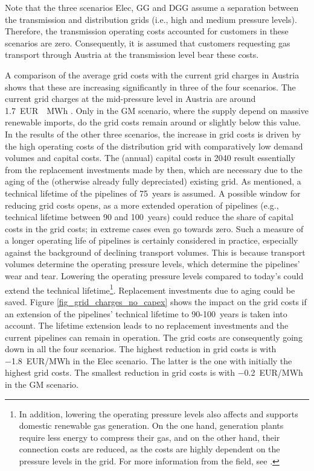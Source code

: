 Note that the three scenarios Elec, GG and DGG assume a separation between the transmission and distribution grids (i.e., high and medium pressure levels). Therefore, the transmission operating costs accounted for customers in these scenarios are zero. Consequently, it is assumed that customers requesting gas transport through Austria at the transmission level bear these costs.\vspace{0.3cm}

A comparison of the average grid costs with the current grid charges in Austria shows that these are increasing significantly in three of the four scenarios. The current grid charges at the mid-pressure level in Austria are around \SI{1.7}{EUR \per MWh} \cite{econtrol_gas_charges}. Only in the GM scenario, where the supply depend on massive renewable imports, do the grid costs remain around or slightly below this value. In the results of the other three scenarios, the increase in grid costs is driven by the high operating costs of the distribution grid with comparatively low demand volumes and capital costs. The (annual) capital costs in 2040 result essentially from the replacement investments made by then, which are necessary due to the aging of the (otherwise already fully depreciated) existing grid. As mentioned, a technical lifetime of the pipelines of \SI{75}{years} is assumed. A possible window for reducing grid costs opens, as a more extended operation of pipelines (e.g., technical lifetime between 90 and \SI{100}{years}) could reduce the share of capital costs in the grid costs; in extreme cases even go towards zero. Such a measure of a longer operating life of pipelines is certainly considered in practice, especially against the background of declining transport volumes. This is because transport volumes determine the operating pressure levels, which determine the pipelines' wear and tear. Lowering the operating pressure levels compared to today's could extend the technical lifetime\footnote{In addition, lowering the operating pressure levels also affects and supports domestic renewable gas generation. On the one hand, generation plants require less energy to compress their gas, and on the other hand, their connection costs are reduced, as the costs are highly dependent on the pressure levels in the grid. For more information from the field, see \cite{biogas_einspeisung}.}. Replacement investments due to aging could be saved. Figure \ref{fig_grid_charges_no_capex} shows the impact on the grid costs if an extension of the pipelines' technical lifetime to \SI{90}{}-\SI{100}{years} is taken into account. The lifetime extension leads to no replacement investments and the current pipelines can remain in operation. The grid costs are consequently going down in all the four scenarios. The highest reduction in grid costs is with \SI{-1.8}{EUR/MWh} in the Elec scenario. The latter is the one with initially the highest grid costs. The smallest reduction in grid costs is with \SI{-0.2}{EUR/MWh} in the GM scenario.

